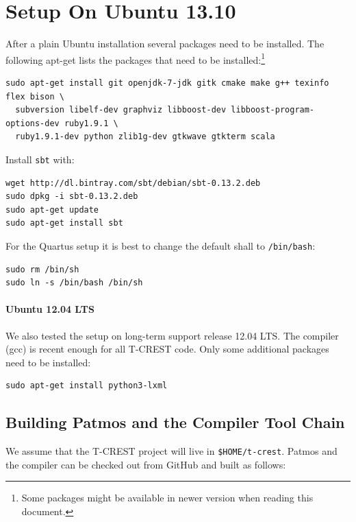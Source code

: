 \documentclass[a4paper,fontsize=10pt,twoside,DIV15,BCOR12mm,headinclude=true,footinclude=false,pagesize,bibtotoc]{scrbook}
\newcommand{\code}[1]{{\texttt{#1}}}
\begin{document}
\section{Setup On Ubuntu 13.10}

After a plain Ubuntu installation several packages need to be installed.
The following apt-get lists the packages that need to be
installed:\footnote{Some packages might be available in newer version
when reading this document.}

\begin{verbatim}
sudo apt-get install git openjdk-7-jdk gitk cmake make g++ texinfo flex bison \
  subversion libelf-dev graphviz libboost-dev libboost-program-options-dev ruby1.9.1 \
  ruby1.9.1-dev python zlib1g-dev gtkwave gtkterm scala
\end{verbatim}

Install \code{sbt} with:

\begin{verbatim}
wget http://dl.bintray.com/sbt/debian/sbt-0.13.2.deb
sudo dpkg -i sbt-0.13.2.deb
sudo apt-get update
sudo apt-get install sbt
\end{verbatim}

For the Quartus setup it is best to change the default shall to \code{/bin/bash}:

\begin{verbatim}
sudo rm /bin/sh
sudo ln -s /bin/bash /bin/sh
\end{verbatim}

\paragraph{Ubuntu 12.04 LTS}

We also tested the setup on long-term support release 12.04 LTS. The compiler
(gcc) is recent enough for all T-CREST code. Only some additional packages need to
be installed:

\begin{verbatim}
sudo apt-get install python3-lxml
\end{verbatim}

\subsection{Building Patmos and the Compiler Tool Chain}
\label{sec:build:compiler}

We assume that the T-CREST project will live in \code{\$HOME/t-crest}.
Patmos and the compiler can be checked out from GitHub and built as follows:
\end{document}
